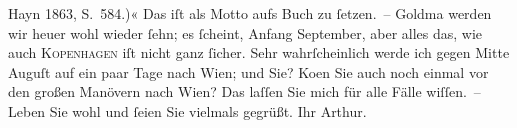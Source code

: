 \begin{ledgroupsized}[t]{13cm}
{{{{                        Hayn}{ }1863, S. 584.)}}}\label{K_L00467_1h}« Das iſt als Motto aufs Buch zu
               ſetzen. –\pend
           \pstart
           Goldma{\geminationn} werden wir heuer wohl wieder ſehn; es ſcheint, Anfang September,
               aber alles das, wie auch \textsc{Kopenhagen} iſt nicht ganz ſicher. Sehr wahrſcheinlich werde ich gegen Mitte
                  Auguſt auf ein paar Tage nach Wien; und
               Sie? Ko{\geminationm}en Sie auch noch einmal vor den großen Manövern
               nach Wien? Das {\pb}laſſen
               Sie mich für alle Fälle wiſſen. –\pend
           \pstart
           Leben Sie wohl und ſeien Sie vielmals gegrüßt.\pend
           \pstart Ihr \spacefill\mbox{Arthur.}\pend{}
         
         \endnumbering{}\end{ledgroupsized}  \newcommand{\dateiname}{L00467}\newcommand{\titel}{Arthur Schnitzler an Hugo von Hofmannsthal, 28. 7. 1895}\newcommand{\editorInnen}{Martin Anton Müller und Gerd-Hermann Susen}
      